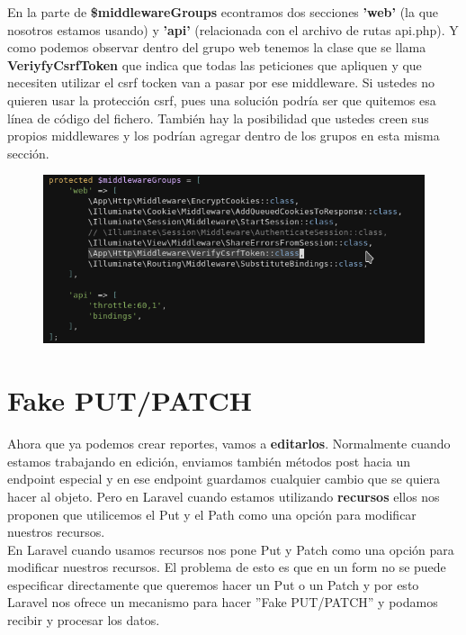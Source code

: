 \documentclass{article}
\begin{document}
En la parte de \textbf{\$middlewareGroups} econtramos dos secciones
\textbf{'web'} (la que nosotros estamos usando) y \textbf{'api'} (relacionada
con el archivo de rutas api.php). Y como podemos observar dentro del grupo web
tenemos la clase que se llama \textbf{VeriyfyCsrfToken} que indica que todas
las peticiones que apliquen y que necesiten utilizar el csrf tocken van a pasar
por ese middleware. Si ustedes no quieren usar la protección csrf, pues una
solución podría ser que quitemos esa línea de código del fichero. También hay
la posibilidad que ustedes creen sus propios middlewares y los podrían agregar
dentro de los grupos en esta misma sección.\\

\begin{figure}[h!]
  \centering
  \includegraphics[scale=0.75]{./Pictures/068_middlewareGroups.png}
\end{figure}

\newpage

\section{Fake PUT/PATCH}%
Ahora que ya podemos crear reportes, vamos a \textbf{editarlos}. Normalmente
cuando estamos trabajando en edición, enviamos también métodos post hacia un
endpoint especial y en ese endpoint guardamos cualquier cambio que se quiera
hacer al objeto. Pero en Laravel cuando estamos utilizando \textbf{recursos}
ellos nos proponen que utilicemos el Put y el Path como una opción para
modificar nuestros recursos.\\

En Laravel cuando usamos recursos nos pone Put y Patch como una opción para
modificar nuestros recursos. El problema de esto es que en un form no se puede
especificar directamente que queremos hacer un Put o un Patch y por esto
Laravel nos ofrece un mecanismo para hacer ”Fake PUT/PATCH” y podamos recibir y
procesar los datos.\\
\end{document}
